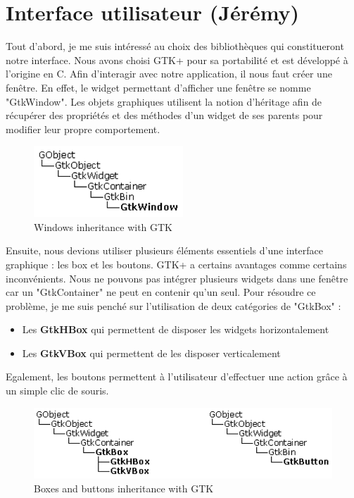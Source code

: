 \documentclass[12pt]{report}
\begin{document}
\section{Interface utilisateur (Jérémy)}

Tout d’abord, je me suis intéressé au choix des bibliothèques qui constitueront notre interface. Nous avons choisi GTK+ pour sa portabilité et est développé à l’origine en C.
Afin d’interagir avec notre application, il nous faut créer une fenêtre. En effet, le widget permettant d’afficher une fenêtre se nomme "GtkWindow". Les objets graphiques utilisent la notion d’héritage afin de récupérer des propriétés et des méthodes d’un widget de ses parents pour modifier leur propre comportement. 

\begin{figure}[H]
    \centering
    \includegraphics[width=0.5\textwidth]{GTK1}
    \caption{Windows inheritance with GTK}
\end{figure}

Ensuite, nous devions utiliser plusieurs éléments essentiels d’une interface graphique : les box et les boutons. GTK+ a certains avantages comme certains inconvénients. Nous ne pouvons pas intégrer plusieurs widgets dans une fenêtre car un "GtkContainer" ne peut en contenir qu’un seul. Pour résoudre ce problème, je me suis penché sur l’utilisation de deux catégories de "GtkBox" :

\begin{itemize}[label=\textbullet]
	\item Les \textbf{GtkHBox} qui permettent de disposer les widgets horizontalement
	\item Les \textbf{GtkVBox} qui permettent de les disposer verticalement
\end{itemize}

Egalement, les boutons permettent à l’utilisateur d’effectuer une action grâce à un simple clic de souris. 

\begin{figure}[H]
    \centering
    \includegraphics[width=1\textwidth]{GTK2}
    \caption{Boxes and buttons inheritance with GTK}
\end{figure}
\end{document}
